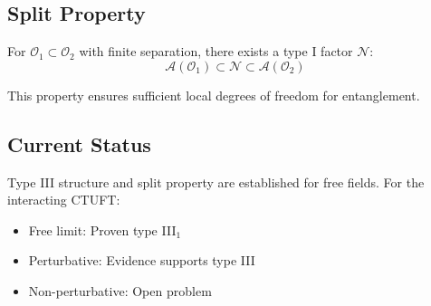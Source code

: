 \subsection{Split Property}

\begin{conjecture}
For $\mathcal{O}_1 \subset \mathcal{O}_2$ with finite separation, there exists a type I factor $\mathcal{N}$:
\begin{equation}
    \mathcal{A}(\mathcal{O}_1) \subset \mathcal{N} \subset \mathcal{A}(\mathcal{O}_2)
\end{equation}
\end{conjecture}

This property ensures sufficient local degrees of freedom for entanglement.

\subsection{Current Status}

Type III structure and split property are established for free fields. For the interacting CTUFT:
\begin{itemize}
    \item Free limit: Proven type III$_1$
    \item Perturbative: Evidence supports type III
    \item Non-perturbative: Open problem
\end{itemize}
